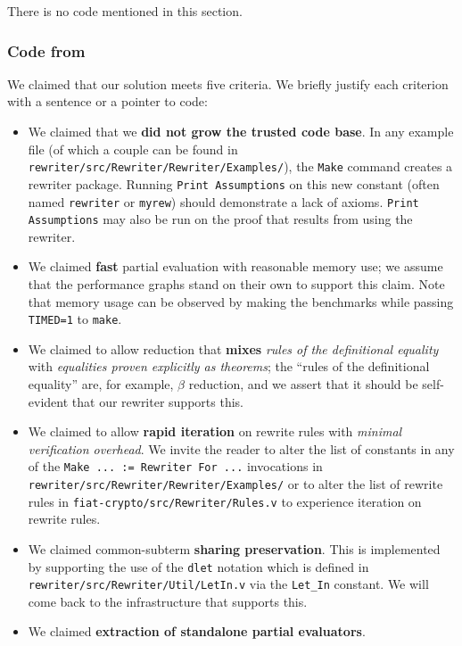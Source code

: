 \documentclass[a4paper,USenglish,cleveref,autoref,thm-restate]{lipics-v2021}
\begin{document}
There is no code mentioned in this section.

\subsubsection{Code from }

We claimed that our solution meets five criteria.
We briefly justify each criterion with a sentence or a pointer to code:
\begin{itemize}
  \item
    We claimed that we \textbf{did not grow the trusted code base}.
    In any example file (of which a couple can be found in \texttt{rewriter/src/Rewriter/Rewriter/Examples/}), the \texttt{Make} command creates a rewriter package.
    Running \texttt{Print Assumptions} on this new constant (often named \texttt{rewriter} or \texttt{myrew}) should demonstrate a lack of axioms.
    \texttt{Print Assumptions} may also be run on the proof that results from using the rewriter.
  \item
    We claimed \textbf{fast} partial evaluation with reasonable memory use; we assume that the performance graphs stand on their own to support this claim.
    Note that memory usage can be observed by making the benchmarks while passing \texttt{TIMED=1} to \texttt{make}.
  \item
    We claimed to allow reduction that \textbf{mixes} \emph{rules of the definitional equality} with \emph{equalities proven explicitly as theorems}; the ``rules of the definitional equality'' are, for example, $\beta$ reduction, and we assert that it should be self-evident that our rewriter supports this.
  \item
    We claimed to allow \textbf{rapid iteration} on rewrite rules with \emph{minimal verification overhead}.
    We invite the reader to alter the list of constants in any of the \texttt{Make ... := Rewriter For ...} invocations in \texttt{rewriter/src/Rewriter/Rewriter/Examples/} or to alter the list of rewrite rules in \texttt{fiat-crypto/src/Rewriter/Rules.v} to experience iteration on rewrite rules.
  \item
    We claimed common-subterm \textbf{sharing preservation}.
    This is implemented by supporting the use of the \texttt{dlet} notation which is defined in \texttt{rewriter/src/Rewriter/Util/LetIn.v} via the \texttt{Let\_In} constant.
    We will come back to the infrastructure that supports this.
  \item
    We claimed \textbf{extraction of standalone partial evaluators}.

\end{itemize}
\end{document}
